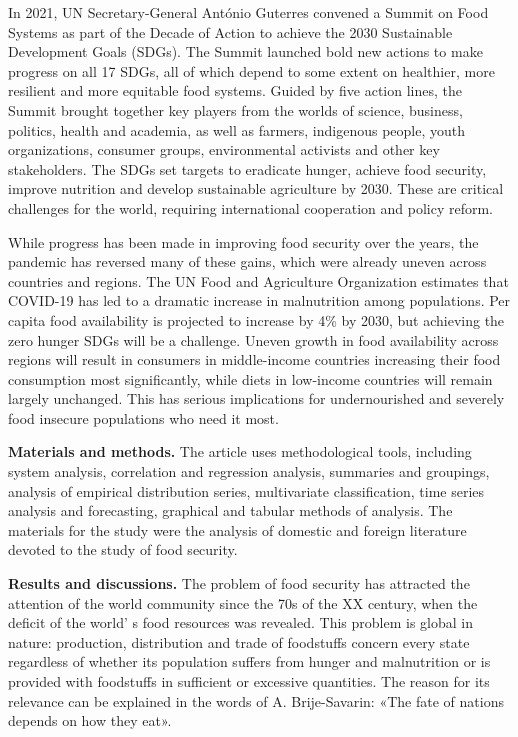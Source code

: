 {In 2021, UN Secretary-General António Guterres convened a Summit on Food
Systems as part of the Decade of Action to achieve the 2030 Sustainable
Development Goals (SDGs). The Summit launched bold new actions to make
progress on all 17 SDGs, all of which depend to some extent on
healthier, more resilient and more equitable food systems. Guided by
five action lines, the Summit brought together key players from the
worlds of science, business, politics, health and academia, as well as
farmers, indigenous people, youth organizations, consumer groups,
environmental activists and other key stakeholders. The SDGs set targets
to eradicate hunger, achieve food security, improve nutrition and
develop sustainable agriculture by 2030. These are critical challenges
for the world, requiring international cooperation and policy reform.

While progress has been made in improving food security over the years,
the pandemic has reversed many of these gains, which were already uneven
across countries and regions. The UN Food and Agriculture Organization
estimates that COVID-19 has led to a dramatic increase in malnutrition
among populations. Per capita food availability is projected to increase
by 4\% by 2030, but achieving the zero hunger SDGs will be a challenge.
Uneven growth in food availability across regions will result in
consumers in middle-income countries increasing their food consumption
most significantly, while diets in low-income countries will remain
largely unchanged. This has serious implications for undernourished and
severely food insecure populations who need it most.

{\bfseries Materials and methods.} The article uses methodological tools,
including system analysis, correlation and regression analysis,
summaries and groupings, analysis of empirical distribution series,
multivariate classification, time series analysis and forecasting,
graphical and tabular methods of analysis. The materials for the study
were the analysis of domestic and foreign literature devoted to the
study of food security.

{\bfseries Results and discussions.} The problem of food security has
attracted the attention of the world community since the 70s of the XX
century, when the deficit of the world' s food resources
was revealed. This problem is global in nature: production, distribution
and trade of foodstuffs concern every state regardless of whether its
population suffers from hunger and malnutrition or is provided with
foodstuffs in sufficient or excessive quantities. The reason for its
relevance can be explained in the words of A. Brije-Savarin: «The fate
of nations depends on how they eat».

}

